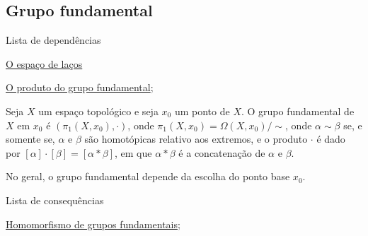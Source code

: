 \subsection{Grupo fundamental}
\label{grupo-fundamental-def}
\begin{titlemize}{Lista de dependências}
	\item \hyperref[espaco-lacos-def]{O espaço de laços}
	\item \hyperref[produto-bem-definido-prop]{O produto do grupo fundamental};\\ %
\end{titlemize}
\begin{defi}
    Seja $X$ um espaço topológico e seja $x_0$ um ponto de $X.$ O grupo fundamental de $X$ em $x_0$ é $(\pi_1(X,x_0),\cdot)$, onde $\pi_1(X,x_0) = \Omega(X,x_0)/\sim$, onde $\alpha \sim \beta$ se, e somente se, $\alpha$ e $\beta$ são homotópicas relativo aos extremos, e o produto $\cdot$ é dado por $[\alpha]\cdot[\beta] = [\alpha \ast \beta]$, em que $\alpha \ast \beta$ é a concatenação de $\alpha$ e $\beta$.
\end{defi}

No geral, o grupo fundamental depende da escolha do ponto base $x_0$.

\begin{titlemize}{Lista de consequências}
	\item \hyperref[hom-grupo-fundamental]{Homomorfismo de grupos fundamentais};%
\end{titlemize}
